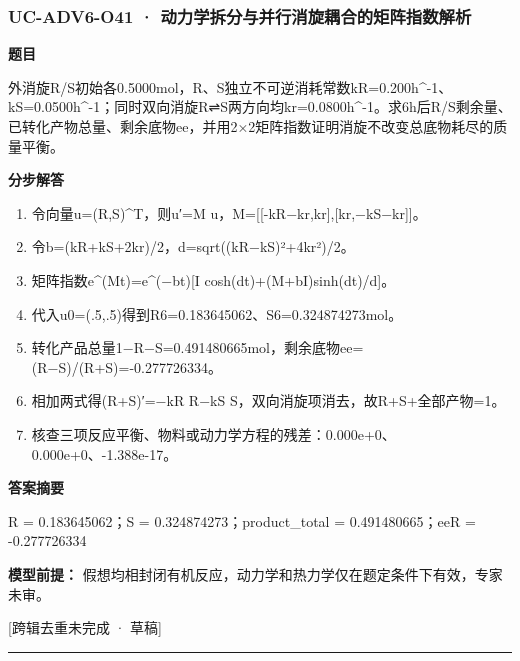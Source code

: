 \documentclass[UTF8,11pt,a4paper]{ctexart}
\begin{document}
\subsubsection*{UC-ADV6-O41 · 动力学拆分与并行消旋耦合的矩阵指数解析}
\noindent\textbf{题目}\par
外消旋R/S初始各0.5000mol，R、S独立不可逆消耗常数kR=0.200h\textasciicircum{}-1、kS=0.0500h\textasciicircum{}-1；同时双向消旋R⇌S两方向均kr=0.0800h\textasciicircum{}-1。求6h后R/S剩余量、已转化产物总量、剩余底物ee，并用2×2矩阵指数证明消旋不改变总底物耗尽的质量平衡。\par
\medskip\noindent\textbf{分步解答}
\begin{enumerate}
\item 令向量u=(R,S)\textasciicircum{}T，则u′=M u，M=[[-kR−kr,kr],[kr,−kS−kr]]。
\item 令b=(kR+kS+2kr)/2，d=sqrt((kR−kS)²+4kr²)/2。
\item 矩阵指数e\textasciicircum{}(Mt)=e\textasciicircum{}(−bt)[I cosh(dt)+(M+bI)sinh(dt)/d]。
\item 代入u0=(.5,.5)得到R6=0.183645062、S6=0.324874273mol。
\item 转化产品总量1−R−S=0.491480665mol，剩余底物ee=(R−S)/(R+S)=-0.277726334。
\item 相加两式得(R+S)′=−kR R−kS S，双向消旋项消去，故R+S+全部产物=1。
\item 核查三项反应平衡、物料或动力学方程的残差：0.000e+0、0.000e+0、-1.388e-17。
\end{enumerate}
\noindent\textbf{答案摘要}\par
R = 0.183645062；S = 0.324874273；product\_total = 0.491480665；eeR = -0.277726334\par
\noindent\textbf{模型前提：}
假想均相封闭有机反应，动力学和热力学仅在题定条件下有效，专家未审。\par
\noindent\textcolor{red!65!black}{[跨辑去重未完成 · 草稿]} \par
\medskip\hrule\medskip
{}
\end{document}
